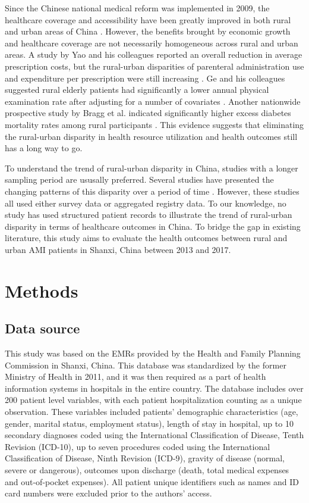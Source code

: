 \documentclass[ijerph,article,submit,moreauthors,pdftex,10pt,a4paper]{mdpi}
\theoremstyle{mdpi}
\newcounter{ex}
\newcounter{re}
\theoremstyle{mdpidefinition}
\begin{document}
Since the Chinese national medical reform was implemented in 2009, the healthcare coverage and accessibility have been greatly improved in both rural and urban areas of China \cite{yip2012early, yip2014harnessing}. However, the benefits brought by economic growth and healthcare coverage are not necessarily homogeneous across rural and urban areas. A study by Yao and his colleagues reported an overall reduction in average prescription costs, but the rural-urban disparities of parenteral administration use and expenditure per prescription were still increasing \cite{yao2015urban}. Ge and his colleagues suggested rural elderly patients had significantly a lower annual physical examination rate after adjusting for a number of covariates \cite{ge2017rural}. Another nationwide prospective study by Bragg et al. indicated significantly higher excess diabetes mortality rates among rural participants \cite{bragg2017association}. This evidence suggests that eliminating the rural-urban disparity in health resource utilization and health outcomes still has a long way to go.


To understand the trend of rural-urban disparity in China, studies with a longer sampling period are ususally preferred. Several studies have presented the changing patterns of this disparity over a period of time \cite{zhang2007disparity, fu2014trend, hu2014national, sun2017trends}. However, these studies  all used either survey data or aggregated registry data. To our knowledge, no study has used structured patient records to illustrate the trend of rural-urban disparity in terms of healthcare outcomes in China. To bridge the gap in existing literature, this study aims to evaluate the health outcomes between rural and urban AMI patients in Shanxi, China between 2013 and 2017.


\section{Methods}
\subsection{Data source}
This study was based on the EMRs provided by the Health and Family Planning Commission in Shanxi, China. This database was standardized by the former Ministry of Health in 2011, and it was then required as a part of health information systems in hospitals in the entire country. The database includes over 200 patient level variables, with each patient hospitalization counting as a unique observation. These variables included patients’ demographic characteristics (age, gender, marital status, employment status), length of stay in hospital, up to 10 secondary diagnoses coded using the International Classification of Disease, Tenth Revision (ICD-10), up to seven procedures coded using the International Classification of Disease, Ninth Revision (ICD-9), gravity of disease (normal, severe or dangerous),  outcomes upon discharge (death, total medical expenses and out-of-pocket expenses). All patient unique identifiers such as names and ID card numbers were excluded prior to the authors' access.
\end{document}
